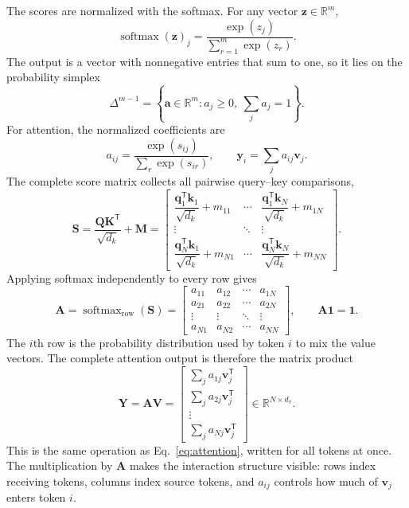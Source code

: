 \documentclass[11pt]{article}
\begin{document}
The scores are normalized with the softmax. For any vector $\mathbf z\in\mathbb R^m$,
\begin{equation}
\operatorname{softmax}(\mathbf z)_j
=
\frac{\exp(z_j)}{\sum_{r=1}^{m}\exp(z_r)}.
\label{eq:softmax}
\end{equation}
The output is a vector with nonnegative entries that sum to one, so it lies on the probability simplex
\begin{equation}
\Delta^{m-1}
=
\left\{
\mathbf a\in\mathbb R^m:
a_j\geq0,
\ \sum_j a_j=1
\right\}.
\end{equation}
For attention, the normalized coefficients are
\begin{equation}
a_{ij}
=
\frac{\exp(s_{ij})}{\sum_r\exp(s_{ir})},
\qquad
\mathbf y_i
=
\sum_j a_{ij}\mathbf v_j.
\label{eq:attention}
\end{equation}
The complete score matrix collects all pairwise query--key comparisons,
\begin{equation}
\mathbf S
=
\frac{\mathbf Q\mathbf K^{\mathsf T}}{\sqrt{d_k}}
+
\mathbf M
=
\begin{bmatrix}
\dfrac{\mathbf q_1^{\mathsf T}\mathbf k_1}{\sqrt{d_k}}+m_{11}
&
\cdots
&
\dfrac{\mathbf q_1^{\mathsf T}\mathbf k_N}{\sqrt{d_k}}+m_{1N}
\\[6pt]
\vdots & \ddots & \vdots
\\[4pt]
\dfrac{\mathbf q_N^{\mathsf T}\mathbf k_1}{\sqrt{d_k}}+m_{N1}
&
\cdots
&
\dfrac{\mathbf q_N^{\mathsf T}\mathbf k_N}{\sqrt{d_k}}+m_{NN}
\end{bmatrix}.
\label{eq:score-matrix}
\end{equation}
Applying softmax independently to every row gives
\begin{equation}
\mathbf A
=
\operatorname{softmax}_{\mathrm{row}}(\mathbf S)
=
\begin{bmatrix}
a_{11} & a_{12} & \cdots & a_{1N}\\
a_{21} & a_{22} & \cdots & a_{2N}\\
\vdots & \vdots & \ddots & \vdots\\
a_{N1} & a_{N2} & \cdots & a_{NN}
\end{bmatrix},
\qquad
\mathbf A\mathbf 1=\mathbf 1.
\label{eq:attention-matrix}
\end{equation}
The $i$th row is the probability distribution used by token $i$ to mix the value vectors. The complete attention output is therefore the matrix product
\begin{equation}
\mathbf Y
=
\mathbf A\mathbf V
=
\begin{bmatrix}
\sum_j a_{1j}\mathbf v_j^{\mathsf T}\\
\sum_j a_{2j}\mathbf v_j^{\mathsf T}\\
\vdots\\
\sum_j a_{Nj}\mathbf v_j^{\mathsf T}
\end{bmatrix}
\in\mathbb R^{N\times d_v}.
\label{eq:attention-matrix-output}
\end{equation}
This is the same operation as Eq.~\eqref{eq:attention}, written for all tokens at once. The multiplication by $\mathbf A$ makes the interaction structure visible: rows index receiving tokens, columns index source tokens, and $a_{ij}$ controls how much of $\mathbf v_j$ enters token $i$.
\end{document}
